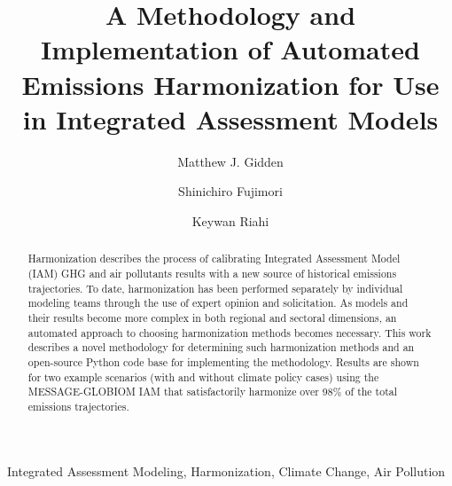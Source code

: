 \begin{frontmatter}

\title{A Methodology and Implementation of Automated Emissions Harmonization for Use in Integrated Assessment Models}

\author[iiasa]{Matthew J. Gidden}

\author[iiasa,nies]{Shinichiro Fujimori}
\author[iiasa]{Keywan Riahi}

\address[iiasa]{International Institute for Applied Systems Analysis,
  Schlossplatz 1, A-2361 Laxenburg, Austria}
\address[nies]{National Institute for Environmental Studies, Tsukuba, Japan}

\begin{abstract}
Harmonization describes the process of calibrating Integrated Assessment Model
(IAM) GHG and air pollutants results with a new source of historical emissions trajectories. To date,
harmonization has been performed separately by individual modeling teams through
% 
% 
% 
the use of expert opinion and solicitation. As models and their results become
more complex in both regional and sectoral dimensions, an automated approach to
choosing harmonization methods becomes necessary. This work describes a novel
% 
% 
methodology for determining such harmonization methods and an open-source Python
code base for implementing the methodology. Results are shown for two example
scenarios (with and without climate policy cases) using the MESSAGE-GLOBIOM IAM that satisfactorily harmonize over 98\%
of the total emissions trajectories.
\end{abstract}

\begin{keyword}
Integrated Assessment Modeling, Harmonization, Climate Change, Air Pollution 
\end{keyword}

\end{frontmatter}

\linenumbers